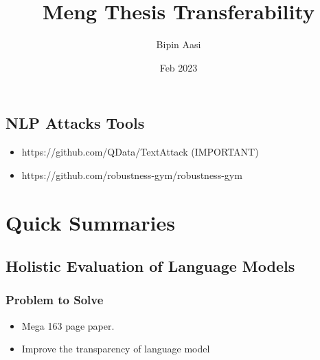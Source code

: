 \documentclass{article}
\title{Meng Thesis Transferability}
\author{Bipin Aasi}
\date{Feb 2023}
\begin{document}
\maketitle

\newpage
\begin{flushleft}

\subsection*{NLP Attacks Tools}
\begin{itemize}
    \item https://github.com/QData/TextAttack (IMPORTANT)
    \item https://github.com/robustness-gym/robustness-gym 
\end{itemize}


\section*{Quick Summaries}



\subsection{Holistic Evaluation of Language Models} 
\subsubsection*{Problem to Solve}
\begin{itemize}
    \item Mega 163 page paper. 
    \item  Improve the transparency of language model
\end{itemize}


\end{flushleft}
\end{document}

